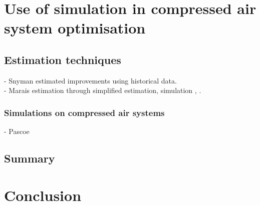 \section{Use of simulation in compressed air system optimisation}
	
	\subsection{Estimation techniques}
	- Snyman estimated improvements using historical data.\cite{Snyman2011Masters}\\
	- Marais estimation through simplified estimation, simulation \cite{Marais2012PhD}, \cite{marais2013simplification}.
	\subsubsection{Simulations on compressed air systems}
		- Pascoe 
	\subsection{Summary}
	\label{Shortcomings of previous work}
		\clearpage	
\section{Conclusion}